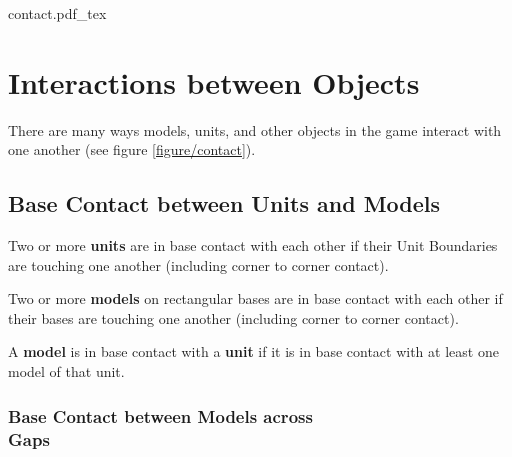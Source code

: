 \begin{figure*}[!htbp]
	\def\svgwidth{\textwidth}
	{contact.pdf_tex}
	\caption{Interaction between objects.\vspace{2pt}}
	\label{figure/contact}
\end{figure*}

\section{Interactions between Objects}
\label{interactions_between_objects}

There are many ways models, units, and other objects in the game interact with one another (see figure \ref{figure/contact}).

\columnbreak

\subsection{Base Contact between Units and Models}
\label{base_contact_between_units_and_models}

Two or more \textbf{units} are in base contact with each other if their Unit Boundaries are touching one another (including corner to corner contact).

Two or more \textbf{models} on rectangular bases are in base contact with each other if their bases are touching one another (including corner to corner contact).

A \textbf{model} is in base contact with a \textbf{unit} if it is in base contact with at least one model of that unit.

\subsubsection[Base Contact between Models across Gaps]{Base Contact between Models across\\ Gaps}
\label{base_contact_between_models_across_gaps}

